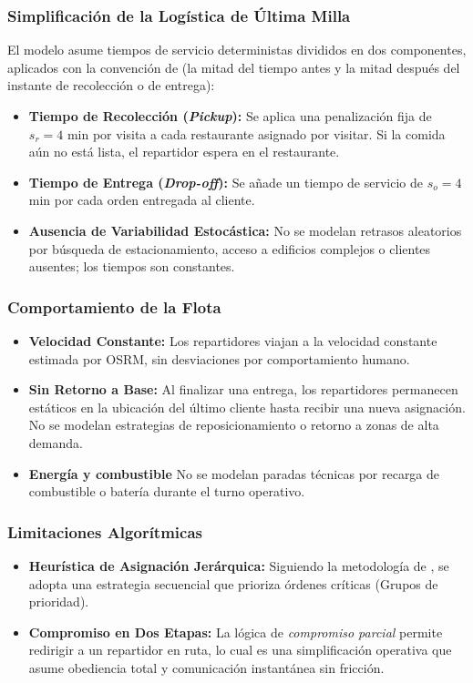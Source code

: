 \documentclass[12pt,letterpaper,oneside]{book}
\begin{document}
\subsubsection{Simplificación de la Logística de Última Milla}
El modelo asume tiempos de servicio deterministas divididos en dos componentes, aplicados con la
convención de \citet{Reyes2018} (la mitad del tiempo antes y la mitad después del instante de
recolección o de entrega):
\begin{itemize}
	\item \textbf{Tiempo de Recolección (\textit{Pickup}):} Se aplica una penalización fija de $s_r = 4$ min por visita a cada restaurante asignado por visitar.
	Si la comida aún no está lista, el repartidor espera en el restaurante.

	\item \textbf{Tiempo de Entrega (\textit{Drop-off}):} Se añade un tiempo de servicio de $s_o = 4$ min por cada orden
	entregada al cliente.
	
	\item \textbf{Ausencia de Variabilidad Estocástica:} No se modelan retrasos aleatorios por búsqueda de estacionamiento, acceso a edificios 
	complejos o clientes ausentes; los tiempos son constantes.
\end{itemize}\subsubsection{Comportamiento de la Flota}

\begin{itemize}
	\item \textbf{Velocidad Constante:} Los repartidores viajan a la velocidad constante estimada por OSRM, sin desviaciones por comportamiento humano.
	
	\item \textbf{Sin Retorno a Base:} Al finalizar una entrega, los repartidores permanecen estáticos en la ubicación del último cliente hasta recibir
	una nueva asignación. No se modelan estrategias de reposicionamiento o retorno a zonas de alta demanda.
	
	\item \textbf{Energía y combustible} No se modelan paradas técnicas por recarga de combustible o batería durante el turno operativo.
\end{itemize}

\subsubsection{Limitaciones Algorítmicas}
\begin{itemize}
	\item \textbf{Heurística de Asignación Jerárquica:} Siguiendo la metodología de \citet{Reyes2018}, se adopta una estrategia 
	secuencial que prioriza órdenes críticas (Grupos de prioridad).
	
	\item \textbf{Compromiso en Dos Etapas:} La lógica de \textit{compromiso parcial} permite redirigir a un repartidor en ruta, lo cual es
	una simplificación operativa que asume obediencia total y comunicación instantánea sin fricción.
\end{itemize}
\end{document}
